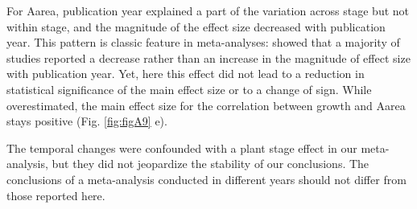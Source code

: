 For Aarea, publication year explained a part of the variation across stage but not within stage, and the magnitude of the effect size decreased with publication year. This pattern is classic feature in meta-analyses: \citealt{Koricheva:2013hy} showed that a majority of studies reported a decrease rather than an increase in the magnitude of effect size with publication year. Yet, here this effect did not lead to a reduction in statistical significance of the main effect size or to a change of sign. While overestimated, the main effect size for the correlation between growth and Aarea stays positive (Fig. \ref{fig:figA9} e).

The temporal changes were confounded with a plant stage effect in our meta-analysis, but they did not jeopardize the stability of our conclusions. The conclusions of a meta-analysis conducted in different years should not differ from those reported here.



